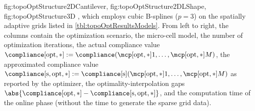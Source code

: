 \begin{table}
{{      fig:topoOptStructure2DCantilever,%
      fig:topoOptStructure2DLShape,%
      fig:topoOptStructure3D%
    }, which employs cubic B-splines ($p = 3$) on the spatially
    adaptive grids listed in \cref{tbl:topoOptResultsModels}.
    From left to right, the columns contain
    the optimization scenario,
    the micro-cell model,
    the number of optimization iterations,
    the actual compliance value
    $\trcmp := \compliance(\mcpoptappr{1}, \dotsc, \mcpoptappr{M})$,
    the approximated compliance value
    $\apcmp := \complianceintp(\mcpoptappr{1}, \dotsc, \mcpoptappr{M})$
    as reported by the optimizer,
    the optimality-interpolation gaps $\abs{\trcmp - \apcmp}$, and
    the computation time of the online phase
    (without the time to generate the sparse grid data).%
  }%
  \label{tbl:topoOptResultsDetailed}%
\end{table}

